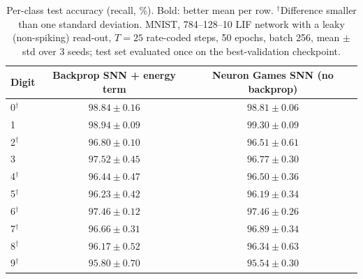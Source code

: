 \documentclass{article}
\begin{document}
\begin{table}[H]
\centering
\small
\caption{Per-class test accuracy (recall, \%). Bold: better mean per row. $^\dagger$Difference smaller than one standard deviation. MNIST, 784--128--10 LIF network with a leaky (non-spiking) read-out, $T=25$ rate-coded steps, 50 epochs, batch 256, mean $\pm$ std over 3 seeds; test set evaluated once on the best-validation checkpoint.}
\label{tab:t2-per-class}
\begin{tabular}{lcc}
\toprule
Digit & Backprop SNN + energy term & Neuron Games SNN (no backprop) \\
\midrule
0$^\dagger$ & $\boldsymbol{98.84 \pm 0.16}$ & $98.81 \pm 0.06$ \\
1 & $98.94 \pm 0.09$ & $\boldsymbol{99.30 \pm 0.09}$ \\
2$^\dagger$ & $\boldsymbol{96.80 \pm 0.10}$ & $96.51 \pm 0.61$ \\
3 & $\boldsymbol{97.52 \pm 0.45}$ & $96.77 \pm 0.30$ \\
4$^\dagger$ & $96.44 \pm 0.47$ & $\boldsymbol{96.50 \pm 0.36}$ \\
5$^\dagger$ & $\boldsymbol{96.23 \pm 0.42}$ & $96.19 \pm 0.34$ \\
6$^\dagger$ & $97.46 \pm 0.12$ & $97.46 \pm 0.26$ \\
7$^\dagger$ & $96.66 \pm 0.31$ & $\boldsymbol{96.89 \pm 0.34}$ \\
8$^\dagger$ & $96.17 \pm 0.52$ & $\boldsymbol{96.34 \pm 0.63}$ \\
9$^\dagger$ & $\boldsymbol{95.80 \pm 0.70}$ & $95.54 \pm 0.30$ \\
\bottomrule
\end{tabular}
\end{table}
\end{document}
